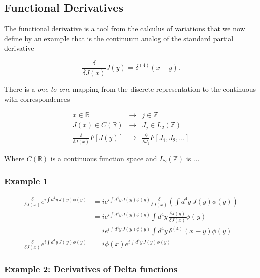 \subsection*{Functional Derivatives}

\noindent The functional derivative is a tool from the calculus of variations that we now define by an example that is the continuum analog of the standard partial derivative

\begin{equation}
\frac{\delta}{\delta J(x)} J(y) = \delta^{(4)} (x-y).
\end{equation}

\noindent There is a \textit{one-to-one} mapping from the discrete representation to the continuous with correspondences

\begin{equation}
\begin{array}{ccc}
x \in \mathbb{R} & \rightarrow & j \in \mathbb{Z} \\
J(x) \in C(\mathbb{R}) & \rightarrow & J_j \in L_2(\mathbb{Z}) \\
\frac{\delta}{\delta J(x)} F[J(y)] & \rightarrow & \frac{\partial}{\partial J_j} F[J_1, J_2, \dots]
\end{array}
\end{equation}

\noindent Where $C(\mathbb{R})$ is a continuous function space and $L_2(\mathbb{Z})$ is ...

\subsubsection*{Example 1}

\begin{align*}
\frac{\delta}{\delta J(x)} e^{i \int d^4 y \, J(y) \phi (y)} &= i e^{i \int d^4 y \, J(y) \phi (y)} \frac{\delta}{\delta J(x)} \left( \int d^4 y \, J(y) \phi (y) \right) \\
&= i e^{i \int d^4 y \, J(y) \phi (y)} \int d^4 y \, \frac{\delta J(y)}{\delta J(x)} \phi(y) \\
&= i e^{i \int d^4 y \, J(y) \phi (y)} \int d^4 y \, \delta^{(4)} (x-y) \phi(y) \\
\frac{\delta}{\delta J(x)} e^{i \int d^4 y \, J(y) \phi (y)} &= i \phi (x) e^{i \int d^4 y \, J(y) \phi (y)}
\end{align*}

\subsubsection*{Example 2: Derivatives of Delta functions}

